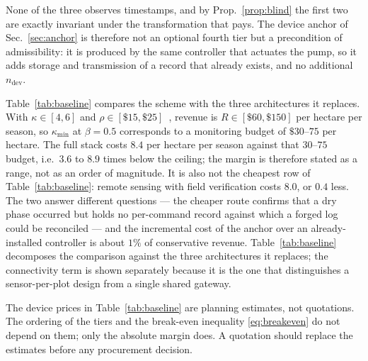 None of the three observes timestamps, and by Prop.~\ref{prop:blind} the first
two are exactly invariant under the transformation that pays. The device anchor
of Sec.~\ref{sec:anchor} is therefore not an optional fourth tier but a
precondition of admissibility: it is produced by the same controller that
actuates the pump, so it adds storage and transmission of a record that already
exists, and no additional $n_{\mathrm{dev}}$.

Table~\ref{tab:baseline} compares the scheme with the three architectures it
replaces. With
$\kappa\in[4,6]$ and $\rho\in[\$15,\$25]$~\cite{rmi2025rice,upstream2026price},
revenue is $R\in[\$60,\$150]$ per hectare per season, so
$\kappa_{\min}$ at $\beta=0.5$ corresponds to a monitoring budget of
$\$30$--$75$ per hectare. The full stack costs $8.4$ per hectare per season against that $30$--$75$
budget, i.e.\ $3.6$ to $8.9$ times below the ceiling; the margin is therefore
stated as a range, not as an order of magnitude. It is also not the cheapest row
of Table~\ref{tab:baseline}: remote sensing with field verification costs $8.0$,
or $0.4$ less. The two answer different questions --- the cheaper route confirms
that a dry phase occurred but holds no per-command record against which a forged
log could be reconciled --- and the incremental cost of the anchor over an
already-installed controller is about $1\%$ of conservative revenue. Table~\ref{tab:baseline}
decomposes the comparison against the three architectures it replaces; the
connectivity term is shown separately because it is the one that distinguishes a
sensor-per-plot design from a single shared gateway.

\begin{remark}
The device prices in Table~\ref{tab:baseline} are planning estimates, not
quotations. The ordering of the tiers and the break-even inequality
\eqref{eq:breakeven} do not depend on them; only the absolute margin does. A
quotation should replace the estimates before any procurement decision.
\end{remark}
